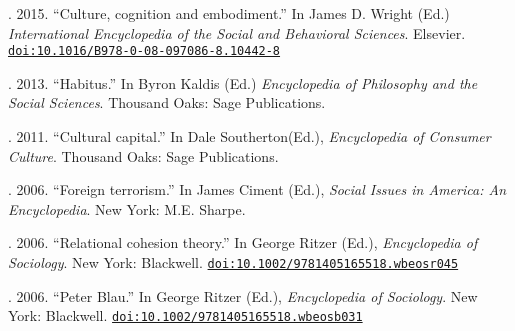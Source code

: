 
. 2015. ``Culture, cognition and embodiment.'' In James D. Wright (Ed.) {\em International Encyclopedia of the Social and Behavioral Sciences}. Elsevier. \href{https://www.rivisteweb.it/doi/10.1016/B978-0-08-097086-8.10442-8}{\nolinkurl{doi:10.1016/B978-0-08-097086-8.10442-8}}

. 2013. ``Habitus.''  In Byron Kaldis (Ed.) {\em Encyclopedia of Philosophy and the Social Sciences}. Thousand Oaks: Sage Publications. 

. 2011. ``Cultural capital.''  In Dale Southerton(Ed.), {\em Encyclopedia of Consumer Culture}.  Thousand Oaks: Sage Publications. 

. 2006. ``Foreign terrorism.'' In James Ciment (Ed.), {\em Social Issues in America: An Encyclopedia}. New York: M.E. Sharpe. 

. 2006. ``Relational cohesion theory.'' In George Ritzer (Ed.), {\em Encyclopedia of Sociology}. New York: Blackwell. \href{https://doi.org/10.1002/9781405165518.wbeosr045}{\nolinkurl{doi:10.1002/9781405165518.wbeosr045}}

. 2006. ``Peter Blau.'' In George Ritzer (Ed.), {\em Encyclopedia of Sociology}. New York: Blackwell.  \href{https://doi.org/10.1002/9781405165518.wbeosb031}{\nolinkurl{doi:10.1002/9781405165518.wbeosb031}}
